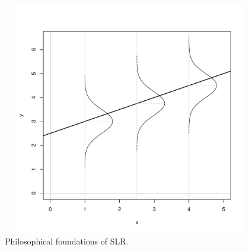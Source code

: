 \documentclass[captions=tableheading]{scrbook}
\begin{document}
\begin{figure}[th]
  \includegraphics[width=5in, height=4in]{img/philosophy.pdf}
  \caption[Philosophical foundations of SLR]{\small Philosophical foundations of SLR.}
  \label{fig:philosophy}
\end{figure}
 
\end{document}
